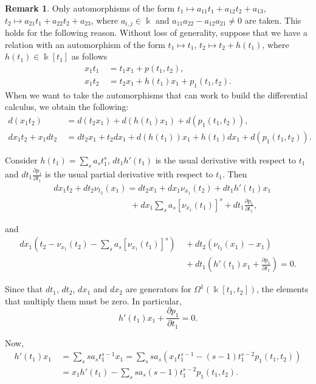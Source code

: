 \documentclass{amsart}
\theoremstyle{definition}
\newtheorem{remark}[theorem]{Remark}
\theoremstyle{remark}
\numberwithin{equation}{section}
\begin{document}
\begin{remark}
Only automorphisms of the form $t_1 \longmapsto a_{11}t_1+a_{12}t_2+a_{13}$, $t_2 \longmapsto a_{21}t_1+a_{22}t_2+a_{23}$, where $a_{i,j}\in \Bbbk$ and $a_{11}a_{22}-a_{12}a_{21}\not = 0$ are taken. This holds for the following reason. Without loss of generality, suppose that we have a relation with an automorphism of the form $t_1 \longmapsto t_1$, $t_2 \longmapsto t_2+h(t_1)$, where $h(t_1)\in\Bbbk[t_1]$ as follows
\begin{align*}
    x_1t_1 &\ =t_1x_1+p(t_1,t_2), \\
    x_1t_2 &\ =t_2x_1+h(t_1)x_1+p_1(t_1,t_2).
\end{align*}
When we want to take the automorphisms that can work to build the differential calculus, we obtain the following:
\begin{align*}
    d(x_1t_2) &\ =d(t_2x_1)+d(h(t_1)x_1)+d(p_1(t_1,t_2)), \\
    dx_1t_2+x_1dt_2 &\ =dt_2x_1+t_2dx_1+d(h(t_1))x_1+h(t_1)dx_1+d(p_1(t_1,t_2)). 
\end{align*}

Consider $h(t_1)=\sum_{s}a_st_1^{s}$, $dt_1h'(t_1)$ is the usual derivative with respect to $t_1$ and $dt_1\frac{\partial p_1}{\partial t_1}$ is the usual partial derivative with respect to $t_1$. Then
\begin{align*}
    &\ dx_1t_2+dt_2\nu_{t_2}(x_1)  =dt_2x_1+dx_1\nu_{x_1}(t_2)+dt_1h'(t_1)x_1 \\
    &\ \quad \quad \quad \quad \quad \quad \quad \quad \quad + dx_1\sum_{s}a_s\left[\nu_{x_1}(t_1)\right]^{s}+dt_1\frac{\partial p_1}{\partial t_1},
\end{align*}

and 
\begin{align*}
dx_1\left(t_2-\nu_{x_1}(t_2)-\sum_{s}a_s[\nu_{x_1}(t_1)]^{s}\right) &\ + dt_2(\nu_{t_2}(x_1)-x_1) \\
&\ + dt_1\left(h'(t_1)x_1+\frac{\partial p_1}{\partial t_1}\right)=0.
\end{align*}

Since that $dt_1$, $dt_2$, $dx_1$ and $dx_2$ are generators for $\Omega^1(\Bbbk[t_1, t_2])$, the elements that multiply them must be zero. In particular, 
\begin{equation}\label{otherauto}
    h'(t_1)x_1+\frac{\partial p_1}{\partial t_1}=0.
\end{equation}

Now, 
\begin{align*}
    h'(t_1)x_1 &\ =\sum_{s}sa_st_1^{s-1}x_1 = \sum_{s}sa_s\left(x_1t_1^{s-1}-(s-1)t_1^{s-2}p_1(t_1,t_2)\right) \\
    &\ = x_1h'(t_1)-\sum_{s}sa_s(s-1)t_1^{s-2}p_1(t_1,t_2).
\end{align*}


\end{remark}
\end{document}
